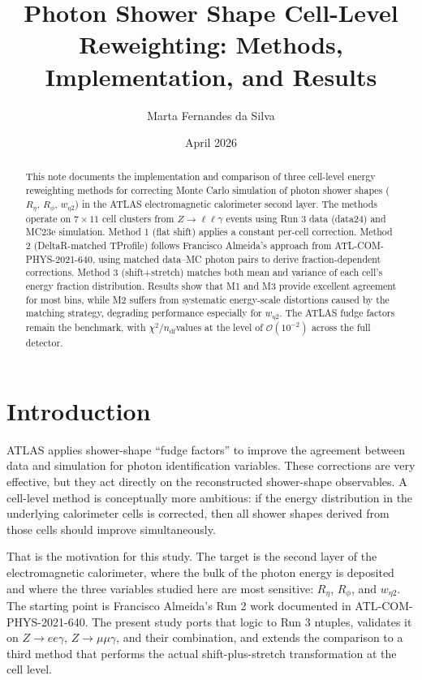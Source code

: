 \documentclass[11pt,a4paper]{article}
\title{\textbf{Photon Shower Shape Cell-Level Reweighting: Methods, Implementation, and Results}}
\author{Marta Fernandes da Silva}
\date{April 2026}
\newcommand{\Reta}{\ensuremath{R_{\eta}}}
\newcommand{\Rphi}{\ensuremath{R_{\phi}}}
\newcommand{\weta}{\ensuremath{w_{\eta 2}}}
\newcommand{\chisq}{\ensuremath{\chi^2 / n_{\mathrm{df}}}}
\begin{document}
\maketitle
\tableofcontents
\newpage

\begin{abstract}
This note documents the implementation and comparison of three cell-level
energy reweighting methods for correcting Monte Carlo simulation of photon
shower shapes (\Reta, \Rphi, \weta) in the ATLAS electromagnetic calorimeter
second layer. The methods operate on $7 \times 11$ cell clusters from
$Z \to \ell\ell\gamma$ events using Run 3 data (data24) and MC23e simulation.
Method 1 (flat shift) applies a constant per-cell correction. Method 2
(DeltaR-matched TProfile) follows Francisco Almeida's approach from
ATL-COM-PHYS-2021-640, using matched data--MC photon pairs to derive
fraction-dependent corrections. Method 3 (shift+stretch) matches both mean and
variance of each cell's energy fraction distribution. Results show that M1 and
M3 provide excellent agreement for most bins, while M2 suffers from systematic
energy-scale distortions caused by the matching strategy, degrading performance
especially for \weta. The ATLAS fudge factors remain the benchmark, with
\chisq values at the level of $\mathcal{O}(10^{-2})$ across the full detector.
\end{abstract}

\section{Introduction}

ATLAS applies shower-shape ``fudge factors'' to improve the agreement between
data and simulation for photon identification variables. These corrections are
very effective, but they act directly on the reconstructed shower-shape
observables. A cell-level method is conceptually more ambitious: if the energy
distribution in the underlying calorimeter cells is corrected, then all shower
shapes derived from those cells should improve simultaneously.

That is the motivation for this study. The target is the second layer of the
electromagnetic calorimeter, where the bulk of the photon energy is deposited
and where the three variables studied here are most sensitive:
\Reta, \Rphi, and \weta. The starting point is Francisco Almeida's Run 2 work
documented in ATL-COM-PHYS-2021-640. The present study ports that logic to Run
3 ntuples, validates it on $Z \to ee\gamma$, $Z \to \mu\mu\gamma$, and their
combination, and extends the comparison to a third method that performs the
actual shift-plus-stretch transformation at the cell level.
\end{document}

